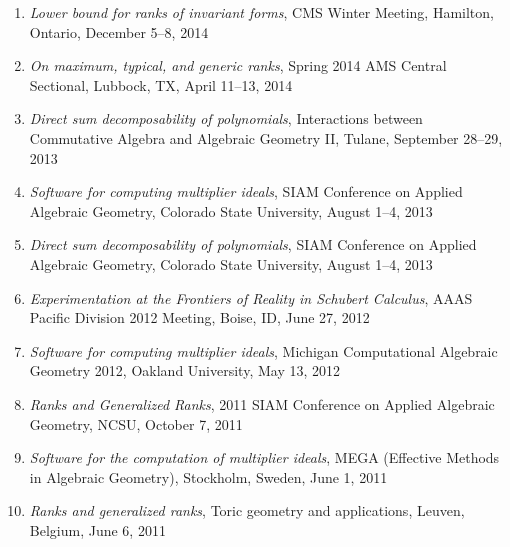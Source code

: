 \documentclass[12pt]{article}
\begin{document}
\begin{enumerate}[revarabic,labelwidth=*]
\item \textit{Lower bound for ranks of invariant forms},
CMS Winter Meeting, Hamilton, Ontario,
December 5--8, 2014

\item \textit{On maximum, typical, and generic ranks},
Spring 2014 AMS Central Sectional, Lubbock, TX,
April 11--13, 2014

\item \textit{Direct sum decomposability of polynomials},
Interactions between Commutative Algebra and Algebraic Geometry II,
Tulane,
September 28--29, 2013

\item \textit{Software for computing multiplier ideals},
SIAM Conference on Applied Algebraic Geometry,
Colorado State University,
August 1--4, 2013

\item \textit{Direct sum decomposability of polynomials},
SIAM Conference on Applied Algebraic Geometry,
Colorado State University,
August 1--4, 2013

\item \textit{Experimentation at the Frontiers of Reality in Schubert Calculus},
AAAS Pacific Division 2012 Meeting,
Boise, ID, June 27, 2012

\item \textit{Software for computing multiplier ideals},
Michigan Computational Algebraic Geometry 2012,
Oakland University, May 13, 2012

\item \textit{Ranks and Generalized Ranks},
2011 SIAM Conference on Applied Algebraic Geometry,
NCSU, October 7, 2011

\item \textit{Software for the computation of multiplier ideals},
MEGA (Effective Methods in Algebraic Geometry), Stockholm, Sweden, June 1, 2011

\item \textit{Ranks and generalized ranks},
Toric geometry and applications, Leuven, Belgium, June 6, 2011


\end{enumerate}
\end{document}
